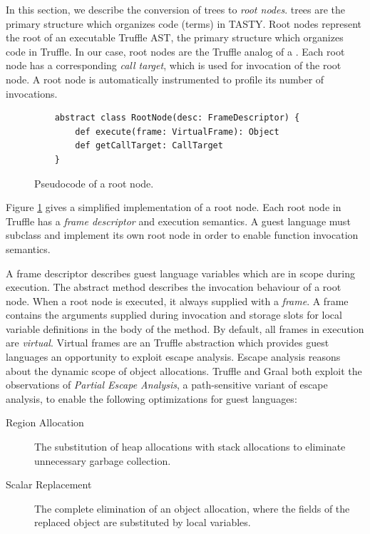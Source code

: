In this section, we describe the conversion of  trees to \textit{root nodes}.
 trees are the primary structure which organizes code (terms) in TASTY.
Root nodes represent the root of an executable Truffle AST, the primary structure which organizes code in Truffle.
In our case, root nodes are the Truffle analog of a .
Each root node has a corresponding \textit{call target}, which is used for invocation of the root node.
A root node is automatically instrumented\cite{profiling:atom} to profile its number of invocations. 

\begin{figure}[!htb]
	\begin{verbatim}
	abstract class RootNode(desc: FrameDescriptor) {
		def execute(frame: VirtualFrame): Object
		def getCallTarget: CallTarget
	}
	\end{verbatim}
	\caption{Pseudocode of a root node.}
	\label{example:root-node}
\end{figure}

Figure \ref{example:root-node} gives a simplified implementation of a root node.
Each root node in Truffle has a \textit{frame descriptor} and execution semantics.
A guest language must subclass and implement its own root node in order to enable function invocation semantics.

A frame descriptor describes guest language variables which are in scope during execution.
The abstract  method describes the invocation behaviour of a root node.
When a root node is executed, it always supplied with a \textit{frame}.
A frame contains the arguments supplied during invocation and storage slots for local variable definitions in the body of the method.
By default, all frames in execution are \textit{virtual}.
Virtual frames are an Truffle abstraction which provides guest languages an opportunity to exploit escape analysis.
Escape analysis\cite{escape-analysis} reasons about the dynamic scope of object allocations. 
Truffle and Graal both exploit the observations of \textit{Partial Escape Analysis}\cite{java:partial-escape-analysis}, a path-sensitive variant of escape analysis, to enable the following optimizations for guest languages:

\begin{description}
	\item[Region Allocation\cite{java:escape-analysis}\cite{tofte:region-memory}] The substitution of heap allocations with stack allocations to eliminate unnecessary garbage collection.
	\item[Scalar Replacement\cite{java:escape-analysis-optimizations}] The complete elimination of an object allocation, where the fields of the replaced object are substituted by local variables.
\end{description}

